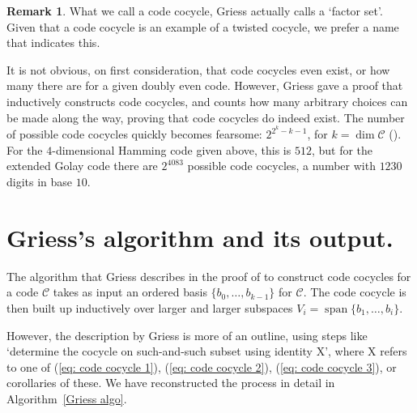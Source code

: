 \documentclass{article}
\theoremstyle{plain}
\theoremstyle{definition}
\newtheorem*{remark}{Remark}
\def \cC {\mathcal{C}}
\DeclareMathOperator{\Span}{span}
\begin{document}
\begin{remark}
What we call a code cocycle, Griess actually calls a `factor set'. Given that a code cocycle is an example of a twisted cocycle, we prefer a name that indicates this.
\end{remark}

It is not obvious, on first consideration, that code cocycles even exist, or how many there are for a given doubly even code. 
However, Griess gave a proof that inductively constructs code cocycles, and counts how many arbitrary choices can be made along the way, proving that code cocycles do indeed exist.
The number of possible code cocycles quickly becomes fearsome: $2^{2^k-k-1}$, for $k=\dim \cC$ (\cite[Theorem 10]{Griess}).
For the $4$-dimensional Hamming code given above, this is $512$, but for the extended Golay code there are $2^{4083}$ possible code cocycles, a number with $1230$ digits in base $10$.



\section{Griess's algorithm and its output.}

The algorithm that Griess describes in the proof of \cite[Theorem 10]{Griess} to construct code cocycles for a code $\cC$ takes as input an ordered  basis $\{b_0,\ldots,b_{k-1}\}$ for $\cC$. 
The code cocycle is then built up inductively over larger and larger subspaces $V_i = \Span\{b_1,\ldots,b_i\}$.%

However, the description by Griess is more of an outline, using steps like `determine the cocycle on such-and-such subset using identity X', where X refers to one of (\ref{eq: code cocycle 1}), (\ref{eq: code cocycle 2}), (\ref{eq: code cocycle 3}), or corollaries of these. We have reconstructed the process in detail in Algorithm~\ref{Griess algo}.


\end{document}
